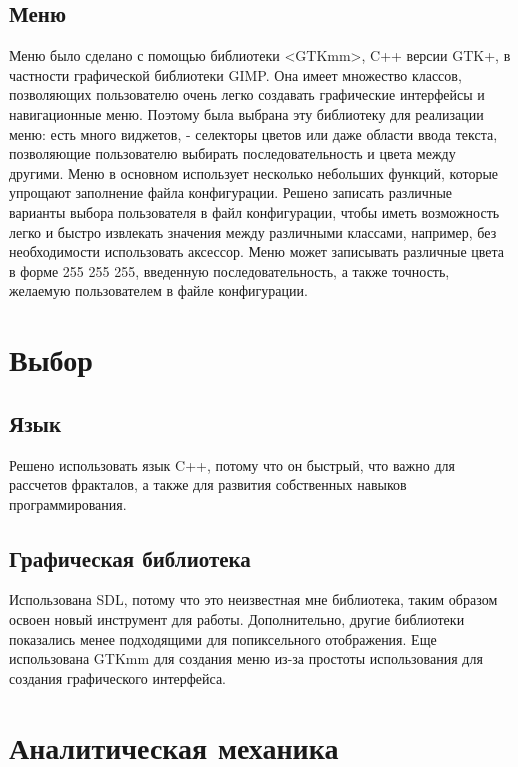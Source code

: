\documentclass[a5paper,10pt, twoside]{article} %
\begin{document}
  \subsection{Меню}
  Меню было сделано с помощью библиотеки <GTKmm>, C++ версии GTK+, в частности графической библиотеки GIMP.
  Она имеет множество классов, позволяющих пользователю очень легко создавать графические интерфейсы и навигационные меню.
  Поэтому была выбрана эту библиотеку для реализации меню: есть много виджетов, - селекторы цветов или даже области ввода 
  текста, позволяющие пользователю выбирать последовательность и цвета между другими.
  Меню в основном использует несколько небольших функций, которые упрощают заполнение файла конфигурации.
  Решено записать различные варианты выбора пользователя в файл конфигурации, чтобы иметь возможность легко 
  и быстро извлекать значения между различными классами, например, без необходимости использовать аксессор.
  Меню может записывать различные цвета в форме 255 255 255, введенную последовательность, а также точность, 
  желаемую пользователем в файле конфигурации.

\section{Выбор}

  \subsection{Язык}
  
  Решено использовать язык C++, потому что он быстрый, что важно для рассчетов фракталов, а также для 
  развития собственных навыков программирования.

  \subsection{Графическая библиотека}

	Использована SDL, потому что это неизвестная мне библиотека, таким образом освоен новый инструмент для работы.
  Дополнительно, другие библиотеки показались менее подходящими для попиксельного отображения.
  Еще использована GTKmm для создания меню из-за простоты использования для создания графического интерфейса.

\section{Аналитическая механика}
\end{document}
